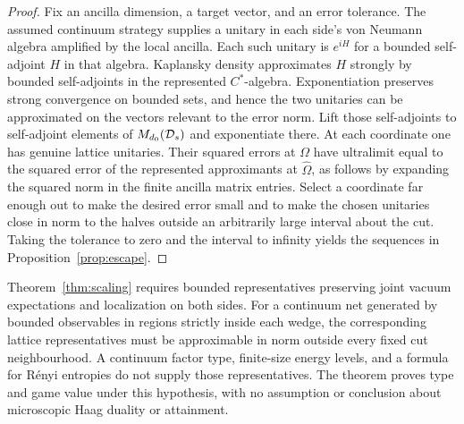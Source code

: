 \begin{proof}
Fix an ancilla dimension, a target vector, and an error tolerance. The assumed
continuum strategy supplies a unitary in each side's von Neumann algebra
amplified by the local ancilla. Each such unitary is $e^{iH}$ for a bounded
self-adjoint $H$ in that algebra. Kaplansky density approximates $H$ strongly
by bounded self-adjoints in the represented $C^*$-algebra. Exponentiation
preserves strong convergence on bounded sets, and hence the two unitaries can
be approximated on the vectors relevant to the error norm. Lift those
self-adjoints to self-adjoint elements of $M_{d_0}(\mathcal D_s)$ and exponentiate there.
At each coordinate one has genuine lattice unitaries. Their squared errors at
$\Omega$ have ultralimit equal to the squared error of the represented
approximants at $\widehat\Omega$, as follows by expanding the squared norm
in the finite ancilla matrix entries. Select a coordinate far enough out to
make the desired error small and to make the chosen unitaries close in norm
to the halves outside an arbitrarily large interval about the cut. Taking
the tolerance to zero and the interval to infinity yields the sequences in
Proposition~\ref{prop:escape}.
\end{proof}

Theorem~\ref{thm:scaling} requires bounded representatives preserving joint
vacuum expectations and localization on both sides. For a continuum net
generated by bounded observables in regions strictly inside each wedge, the
corresponding lattice representatives must be approximable in norm outside
every fixed cut neighbourhood. A continuum factor type, finite-size energy
levels, and a formula for R\'enyi entropies do not supply those representatives.
The theorem proves type and game value under this hypothesis, with no
assumption or conclusion about microscopic Haag duality or attainment.
